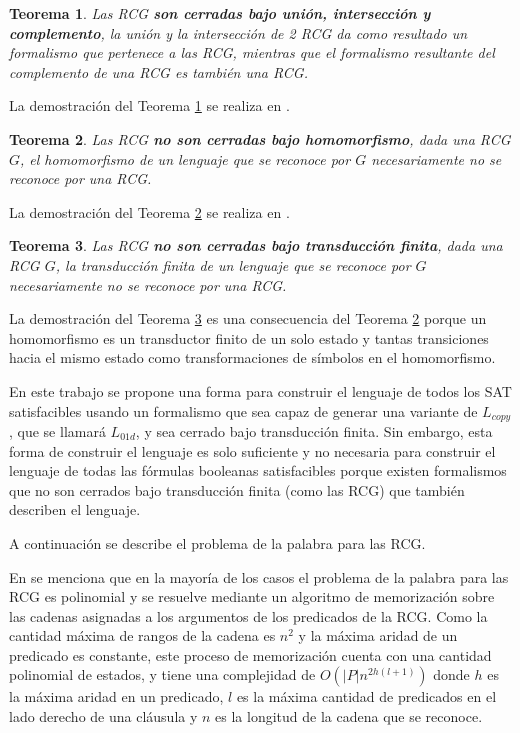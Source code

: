 \documentclass[12pt]{article}
\newtheorem{theorem}{Teorema}
\begin{document}
\begin{theorem}
    \label{teo:RCGset}
    Las RCG \textbf{son cerradas bajo unión, intersección y complemento}, la unión y la intersección de 2 RCG da como resultado un formalismo que pertenece a las RCG, mientras
    que el formalismo resultante del complemento de una RCG es también una RCG.
\end{theorem}

La demostración del Teorema \ref{teo:RCGset} se realiza en \cite{mainRCGBib}.

\begin{theorem}
    \label{teo:RCGh}
    Las RCG \textbf{no son cerradas bajo homomorfismo}, dada una RCG $G$, el homomorfismo de un lenguaje que se reconoce por $G$ necesariamente no se reconoce por una RCG.    
\end{theorem}

La demostración del Teorema \ref{teo:RCGh} se realiza en \cite{propertiesRCGBib}.

\begin{theorem}
    \label{teo:RCGt}
    Las RCG \textbf{no son cerradas bajo transducción finita}, dada una RCG $G$, la transducción finita de un lenguaje que se reconoce por $G$ necesariamente no se reconoce por una RCG.    
\end{theorem}

La demostración del Teorema \ref{teo:RCGt} es una consecuencia del Teorema \ref{teo:RCGh} porque un homomorfismo es un transductor finito de un solo estado y tantas transiciones hacia el mismo estado como transformaciones de símbolos en el homomorfismo.

En este trabajo se propone una forma para construir el lenguaje de todos los SAT satisfacibles usando un formalismo que sea capaz de generar una variante de $L_{copy}$, que se llamará $L_{01d}$, y sea cerrado bajo transducción finita. Sin embargo, esta forma de construir el lenguaje es solo suficiente y no necesaria para construir el lenguaje de todas las fórmulas booleanas satisfacibles porque existen formalismos que no son cerrados bajo transducción finita (como las RCG) que también describen el lenguaje.


A continuación se describe el problema de la palabra para las RCG.


En \cite{mainRCGBib} se menciona que en la mayoría de los casos el problema de la palabra para las RCG es polinomial y se resuelve mediante un algoritmo de memorización sobre las cadenas asignadas a los argumentos de los predicados de la RCG.  Como la cantidad máxima de rangos de la cadena es $n^2$ y la máxima aridad de un predicado es constante, este proceso de memorización cuenta con una cantidad polinomial de estados, y tiene una complejidad de $O(|P|n^{2h(l+1)})$ donde $h$ es la máxima aridad en un predicado, $l$ es la máxima cantidad de predicados en el lado derecho de una cláusula y $n$ es la longitud de la cadena que se reconoce.
\end{document}
